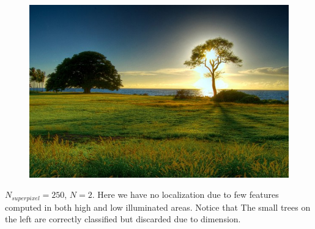 \documentclass[a4paper,titlepaget]{article}
\begin{document}
\begin{figure}[htpb]
	\centering
	\includegraphics[width=.9\textwidth]{images/results/1fin}
\end{figure}
$N_{superpixel}=250$, $N=2$. Here we have no localization due to few features computed in both high and low illuminated areas. Notice that The small trees on the left are correctly classified but discarded due to dimension.
\newpage
\end{document}
